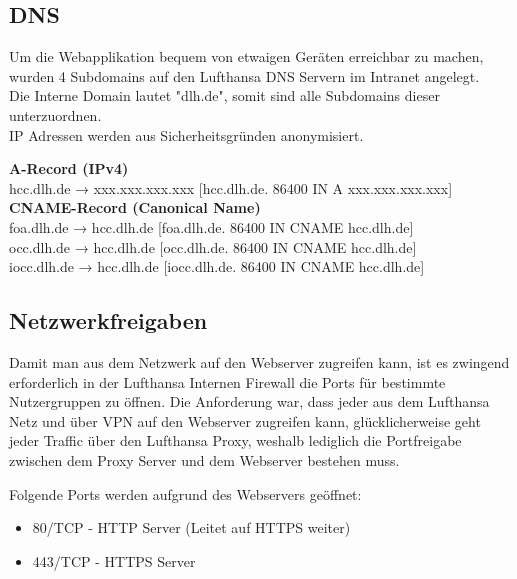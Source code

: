 	\subsection{DNS}
	Um die Webapplikation bequem von etwaigen Geräten erreichbar zu machen, wurden 4 Subdomains auf den Lufthansa DNS Servern im Intranet angelegt.\\
	Die Interne Domain lautet "dlh.de", somit sind alle Subdomains dieser unterzuordnen. \\

	IP Adressen werden aus Sicherheitsgründen anonymisiert.

	\vspace{16pt}

	\textbf{A-Record (IPv4)}\\
	hcc.dlh.de → xxx.xxx.xxx.xxx [hcc.dlh.de. 86400 IN A xxx.xxx.xxx.xxx]\\

	\textbf{CNAME-Record (Canonical Name)}\\
	foa.dlh.de → hcc.dlh.de [foa.dlh.de. 86400 IN CNAME hcc.dlh.de]\\
	occ.dlh.de → hcc.dlh.de [occ.dlh.de. 86400 IN CNAME hcc.dlh.de]\\
	iocc.dlh.de → hcc.dlh.de [iocc.dlh.de. 86400 IN CNAME hcc.dlh.de]\\

	\subsection{Netzwerkfreigaben}
	Damit man aus dem Netzwerk auf den Webserver zugreifen kann, ist es zwingend erforderlich in der Lufthansa Internen Firewall die Ports für bestimmte Nutzergruppen zu öffnen.
	Die Anforderung war, dass jeder aus dem Lufthansa Netz und über VPN auf den Webserver zugreifen kann, glücklicherweise geht jeder Traffic über den Lufthansa Proxy, weshalb lediglich die Portfreigabe zwischen dem Proxy Server und dem Webserver bestehen muss.
	
	Folgende Ports werden aufgrund des Webservers geöffnet:

	\begin{itemize}
		\item 80/TCP - HTTP Server (Leitet auf HTTPS weiter)
		\item 443/TCP - HTTPS Server
	\end{itemize}